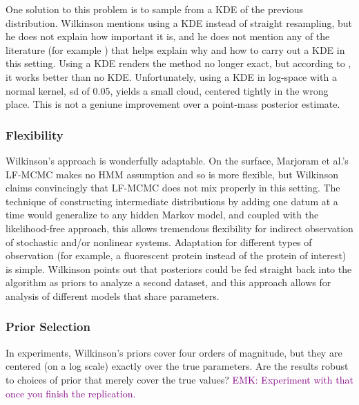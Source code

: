 \documentclass{article}
\newcommand\EMK[1]{\textcolor{purple}{EMK: #1}}
\begin{document}
One solution to this problem is to sample from a KDE of the previous distribution. Wilkinson mentions using a KDE instead of straight resampling, but he does not explain how important it is, and he does not mention any of the literature (for example \cite{particle_filter_tutorial}) that helps explain why and how to carry out a KDE in this setting.  Using a KDE renders the method no longer exact, but according to \cite{particle_filter_tutorial}, it works better than no KDE. %
Unfortunately, using a KDE in log-space with a normal kernel, sd of 0.05, yields a small cloud, centered tightly in the wrong place. This is not a geniune improvement over a point-mass posterior estimate.


\subsubsection{Flexibility}
Wilkinson's approach is wonderfully adaptable. On the surface, Marjoram et al.'s LF-MCMC makes no HMM assumption and so is more flexible, but Wilkinson claims convincingly that LF-MCMC does not mix properly in this setting. The technique of constructing intermediate distributions by adding one datum at a time would generalize to any hidden Markov model, and coupled with the likelihood-free approach, this allows tremendous flexibility for indirect observation of stochastic and/or nonlinear systems. Adaptation for different types of observation (for example, a fluorescent protein instead of the protein of interest) is simple. Wilkinson points out that posteriors could be fed straight back into the algorithm as priors to analyze a second dataset, and this approach allows for analysis of different models that share parameters.

\subsubsection{Prior Selection}
In experiments, Wilkinson's priors cover four orders of magnitude, but they are centered (on a log scale) exactly over the true parameters. Are the results robust to choices of prior that merely cover the true values? \EMK{Experiment with that once you finish the replication.}
\end{document}
